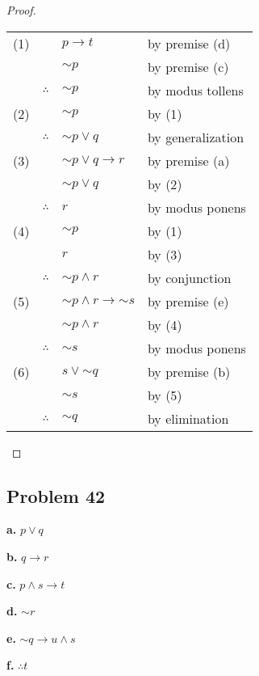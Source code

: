 \documentclass[14pt]{extarticle}
\begin{document}
\begin{proof}
\begin{tabular}{rrll}
(1) & & $p \to t$ & by premise (d) \\
 & & ${\sim p}$ & by premise (c) \\
 & $\therefore$ & ${\sim p}$ & by modus tollens \\
(2) & & ${\sim p}$ & by (1) \\
 & $\therefore$ & ${\sim p} \vee q$ & by generalization \\
(3) & & ${\sim p} \vee q \to r$ & by premise (a) \\
 & & ${\sim p} \vee q$ & by (2) \\
 & $\therefore$ & $r$ & by modus ponens \\
(4) & & ${\sim p}$ & by (1) \\
 & & $r$ & by (3) \\
 & $\therefore$ & ${\sim p} \wedge r$ & by conjunction \\
(5) & & ${\sim p} \wedge r \to {\sim s}$ & by premise (e) \\
 & & ${\sim p} \wedge r$ & by (4) \\
 & $\therefore$ & ${\sim s}$ & by modus ponens \\
(6) & & $s \vee {\sim q}$ & by premise (b) \\
 & & ${\sim s}$ & by (5) \\
 & $\therefore$ & ${\sim q}$ & by elimination \\
\end{tabular}
\end{proof}

\subsection{Problem 42}
{\bf a.} $p \vee q$

{\bf b.} $q \to r$

{\bf c.} $p \wedge s \to t$

{\bf d.} ${\sim r}$

{\bf e.} ${\sim q} \to u \wedge s$

{\bf f.} $\therefore t$
\end{document}

